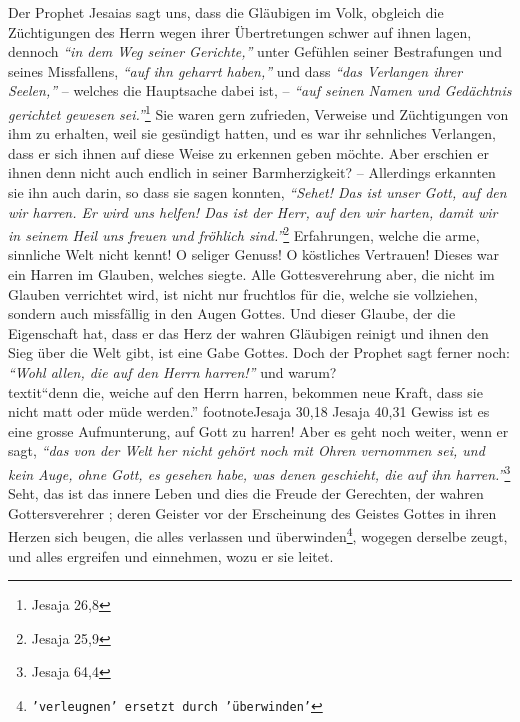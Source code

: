 Der Prophet Jesaias sagt uns, dass die Gläubigen im Volk, obgleich die
Züchtigungen des Herrn wegen ihrer Übertretungen schwer auf ihnen lagen,
dennoch
\textit{"`in dem Weg seiner Gerichte,"'} unter Gefühlen seiner Bestrafungen und
seines Missfallens, \textit{"`auf ihn geharrt haben,"'} und dass \textit{"`das
Verlangen ihrer Seelen,"'} -- welches die Hauptsache dabei ist, --
\textit{"`auf seinen Namen und Gedächtnis gerichtet gewesen
sei."'}\footnote{Jesaja 26,8}
Sie waren gern
zufrieden, Verweise und Züchtigungen von ihm zu erhalten, weil sie gesündigt
hatten, und es war ihr sehnliches Verlangen, dass er sich ihnen auf diese Weise
zu erkennen geben möchte. Aber erschien er ihnen denn
nicht auch endlich in
seiner Barmherzigkeit? -- Allerdings erkannten sie ihn auch darin, so dass sie
sagen konnten,
\textit{"`Sehet! Das ist unser Gott, auf den wir harren. Er wird uns
helfen! Das ist der Herr, auf den wir harten, damit wir in seinem Heil uns
freuen und fröhlich sind."'}\footnote{Jesaja 25,9}
Erfahrungen, welche die arme,
sinnliche Welt nicht kennt!  O seliger Genuss! O köstliches
Vertrauen! Dieses war
ein Harren im Glauben, welches siegte. Alle Gottesverehrung aber, die nicht im
Glauben verrichtet wird, ist nicht nur fruchtlos
 für die, welche sie vollziehen,
sondern auch missfällig in den Augen Gottes. Und dieser Glaube, der die
Eigenschaft hat, dass er das Herz der wahren Gläubigen reinigt und ihnen den
Sieg über die Welt gibt, ist eine Gabe Gottes. Doch
der Prophet sagt
ferner noch:
\textit{"`Wohl allen, die auf den Herrn harren!"'} und warum?\\textit{"`denn
die, weiche
auf den Herrn harren, bekommen neue Kraft, dass sie nicht matt oder müde
werden."'}
footnote{Jesaja 30,18 Jesaja 40,31}
Gewiss ist es eine grosse Aufmunterung, auf Gott
zu harren! Aber es geht noch weiter, wenn er sagt,
\textit{"`das von der Welt her
nicht gehört noch mit Ohren vernommen sei, und kein Auge, ohne Gott, es gesehen
habe, was denen geschieht, die auf ihn harren."'}\footnote{Jesaja 64,4}
Seht, das ist das innere Leben und dies die Freude der Gerechten, der wahren
Gottersverehrer ;
deren Geister vor der Erscheinung des Geistes Gottes in ihren Herzen sich
beugen, die alles verlassen und überwinden\footnote{\texttt{'verleugnen'
ersetzt
durch 'überwinden'}}, wogegen derselbe zeugt, und alles
ergreifen und einnehmen, wozu er sie leitet.

